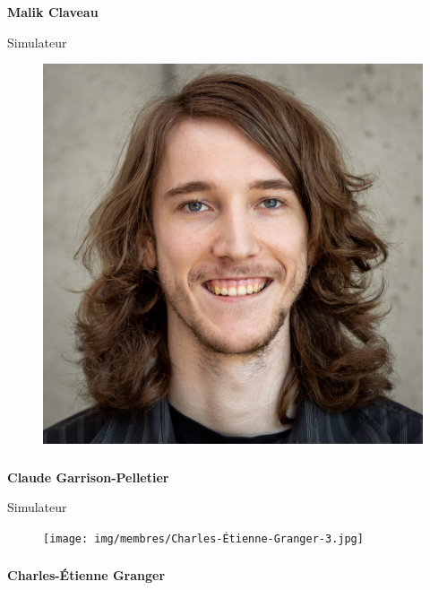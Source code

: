 \documentclass[a0paper,portrait]{baposter}
\begin{document}
\begin{poster}
{\subsubsection*{}
\vspace{2mm}
\textbf{Malik Claveau}


Simulateur
\begin{figure}
\includegraphics[width=.9\linewidth]{img/membres/Claude-Garrison-Pelletier-2.jpg} 
\end{figure}
\subsubsection*{}
\vspace{2mm}
\textbf{Claude Garrison-Pelletier}


Simulateur
\begin{figure}
\texttt{[image: img/membres/Charles-Étienne-Granger-3.jpg]} 
\end{figure}
\subsubsection*{}
\vspace{2mm}
\textbf{Charles-Étienne Granger}


}
\end{poster}
\end{document}
